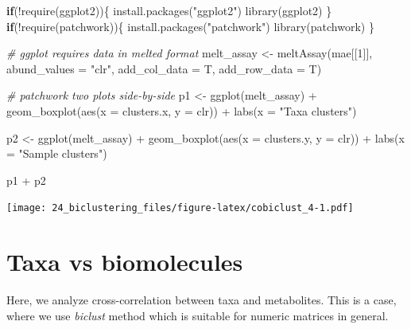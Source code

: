 \documentclass[
]{book}
\newenvironment{Shaded}{\begin{snugshade}}{\end{snugshade}}
\newcommand{\AttributeTok}[1]{\textcolor[rgb]{0.77,0.63,0.00}{#1}}
\newcommand{\CommentTok}[1]{\textcolor[rgb]{0.56,0.35,0.01}{\textit{#1}}}
\newcommand{\ControlFlowTok}[1]{\textcolor[rgb]{0.13,0.29,0.53}{\textbf{#1}}}
\newcommand{\DecValTok}[1]{\textcolor[rgb]{0.00,0.00,0.81}{#1}}
\newcommand{\FunctionTok}[1]{\textcolor[rgb]{0.00,0.00,0.00}{#1}}
\newcommand{\NormalTok}[1]{#1}
\newcommand{\OtherTok}[1]{\textcolor[rgb]{0.56,0.35,0.01}{#1}}
\newcommand{\SpecialCharTok}[1]{\textcolor[rgb]{0.00,0.00,0.00}{#1}}
\newcommand{\StringTok}[1]{\textcolor[rgb]{0.31,0.60,0.02}{#1}}
\begin{document}
\begin{Shaded}
\begin{Highlighting}[]
\ControlFlowTok{if}\NormalTok{(}\SpecialCharTok{!}\FunctionTok{require}\NormalTok{(ggplot2))\{}
    \FunctionTok{install.packages}\NormalTok{(}\StringTok{"ggplot2"}\NormalTok{)}
    \FunctionTok{library}\NormalTok{(ggplot2)}
\NormalTok{\}}
\ControlFlowTok{if}\NormalTok{(}\SpecialCharTok{!}\FunctionTok{require}\NormalTok{(patchwork))\{}
    \FunctionTok{install.packages}\NormalTok{(}\StringTok{"patchwork"}\NormalTok{)}
    \FunctionTok{library}\NormalTok{(patchwork)}
\NormalTok{\}}

\CommentTok{\# ggplot requires data in melted format}
\NormalTok{melt\_assay }\OtherTok{\textless{}{-}} \FunctionTok{meltAssay}\NormalTok{(mae[[}\DecValTok{1}\NormalTok{]], }\AttributeTok{abund\_values =} \StringTok{"clr"}\NormalTok{, }\AttributeTok{add\_col\_data =}\NormalTok{ T, }\AttributeTok{add\_row\_data =}\NormalTok{ T)}

\CommentTok{\# patchwork two plots side{-}by{-}side}
\NormalTok{p1 }\OtherTok{\textless{}{-}} \FunctionTok{ggplot}\NormalTok{(melt\_assay) }\SpecialCharTok{+}
  \FunctionTok{geom\_boxplot}\NormalTok{(}\FunctionTok{aes}\NormalTok{(}\AttributeTok{x =}\NormalTok{ clusters.x, }\AttributeTok{y =}\NormalTok{ clr)) }\SpecialCharTok{+}
  \FunctionTok{labs}\NormalTok{(}\AttributeTok{x =} \StringTok{"Taxa clusters"}\NormalTok{)}

\NormalTok{p2 }\OtherTok{\textless{}{-}} \FunctionTok{ggplot}\NormalTok{(melt\_assay) }\SpecialCharTok{+}
  \FunctionTok{geom\_boxplot}\NormalTok{(}\FunctionTok{aes}\NormalTok{(}\AttributeTok{x =}\NormalTok{ clusters.y, }\AttributeTok{y =}\NormalTok{ clr)) }\SpecialCharTok{+}
  \FunctionTok{labs}\NormalTok{(}\AttributeTok{x =} \StringTok{"Sample clusters"}\NormalTok{)}

\NormalTok{p1 }\SpecialCharTok{+}\NormalTok{ p2}
\end{Highlighting}
\end{Shaded}

\texttt{[image: 24\_biclustering\_files/figure-latex/cobiclust\_4-1.pdf]}

\hypertarget{taxa-vs-biomolecules}{%
\section{Taxa vs biomolecules}\label{taxa-vs-biomolecules}}

Here, we analyze cross-correlation between taxa and metabolites. This is a case, where
we use \emph{biclust} method which is suitable for numeric matrices in general.
\end{document}
